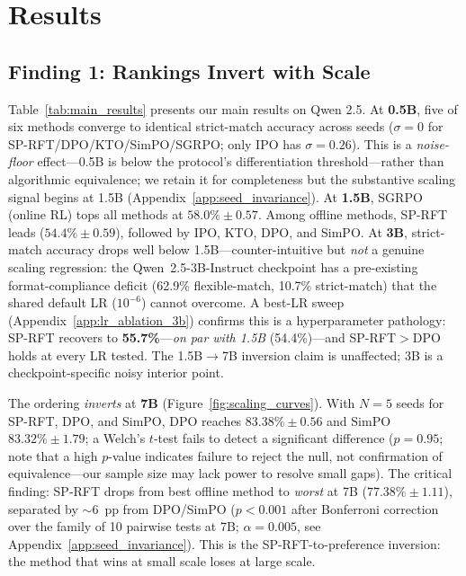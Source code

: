 \documentclass{article}
\newcommand{\sprft}{SP-RFT}
\begin{document}
\section{Results}

\subsection{Finding 1: Rankings Invert with Scale}
\label{sec:ranking_inversion}

Table~\ref{tab:main_results} presents our main results on Qwen 2.5.
At \textbf{0.5B}, five of six methods converge to identical strict-match accuracy across seeds ($\sigma{=}0$ for SP-RFT/DPO/KTO/SimPO/SGRPO; only IPO has $\sigma{=}0.26$). This is a \emph{noise-floor} effect---0.5B is below the protocol's differentiation threshold---rather than algorithmic equivalence; we retain it for completeness but the substantive scaling signal begins at 1.5B (Appendix~\ref{app:seed_invariance}).
At \textbf{1.5B}, SGRPO (online RL) tops all methods at $58.0\% \pm 0.57$. Among offline methods, \sprft{} leads ($54.4\% \pm 0.59$), followed by IPO, KTO, DPO, and SimPO.
At \textbf{3B}, strict-match accuracy drops well below 1.5B---counter-intuitive but \emph{not} a genuine scaling regression: the Qwen~2.5-3B-Instruct checkpoint has a pre-existing format-compliance deficit (62.9\% flexible-match, 10.7\% strict-match) that the shared default LR ($10^{-6}$) cannot overcome. A best-LR sweep (Appendix~\ref{app:lr_ablation_3b}) confirms this is a hyperparameter pathology: \sprft{} recovers to \textbf{55.7\%}---\emph{on par with 1.5B} (54.4\%)---and \sprft{}$>$DPO holds at every LR tested. The 1.5B$\to$7B inversion claim is unaffected; 3B is a checkpoint-specific noisy interior point.

The ordering \emph{inverts} at \textbf{7B} (Figure~\ref{fig:scaling_curves}).
With $N{=}5$ seeds for \sprft{}, DPO, and SimPO, DPO reaches $83.38\% \pm 0.56$ and SimPO $83.32\% \pm 1.79$; a Welch's $t$-test fails to detect a significant difference ($p = 0.95$; note that a high $p$-value indicates failure to reject the null, not confirmation of equivalence---our sample size may lack power to resolve small gaps).
The critical finding: \sprft{} drops from best offline method to \emph{worst} at 7B ($77.38\% \pm 1.11$), separated by ${\sim}$6~pp from DPO/SimPO ($p < 0.001$ after Bonferroni correction over the family of 10 pairwise tests at 7B; $\alpha=0.005$, see Appendix~\ref{app:seed_invariance}).
This is the \sprft{}-to-preference inversion: the method that wins at small scale loses at large scale.
\end{document}
